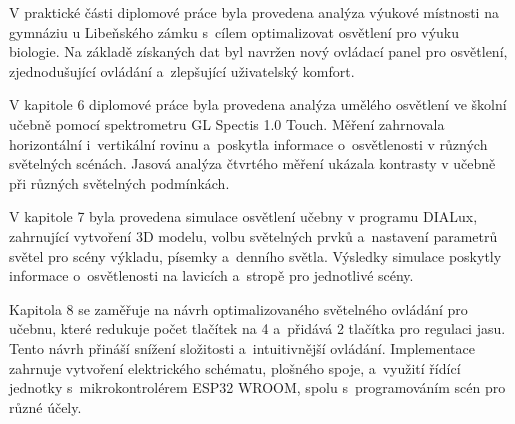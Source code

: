 V praktické části diplomové práce byla provedena analýza výukové místnosti na
gymnáziu u Libeňského zámku s~cílem optimalizovat osvětlení pro výuku biologie.
Na základě získaných dat byl navržen nový ovládací panel pro osvětlení,
zjednodušující ovládání a~zlepšující uživatelský komfort.

V kapitole 6 diplomové práce byla provedena analýza umělého osvětlení ve školní učebně
pomocí spektrometru GL Spectis 1.0 Touch.
Měření zahrnovala horizontální i~vertikální rovinu a~poskytla
informace o~osvětlenosti v různých světelných scénách.
Jasová analýza čtvrtého měření ukázala kontrasty v učebně při různých světelných podmínkách.

V kapitole 7 byla provedena simulace osvětlení učebny v programu DIALux,
zahrnující vytvoření 3D modelu, volbu světelných prvků a~nastavení parametrů
světel pro scény výkladu, písemky a~denního světla.
Výsledky simulace poskytly informace o~osvětlenosti na lavicích a~stropě pro jednotlivé scény.

Kapitola 8 se zaměřuje na návrh optimalizovaného světelného ovládání pro učebnu,
které redukuje počet tlačítek na 4 a~přidává 2 tlačítka pro regulaci jasu.
Tento návrh přináší snížení složitosti a~intuitivnější ovládání.
Implementace zahrnuje vytvoření elektrického schématu, plošného spoje, a~využití
řídící jednotky s~mikrokontrolérem ESP32 WROOM, spolu s~programováním scén pro různé účely. %




